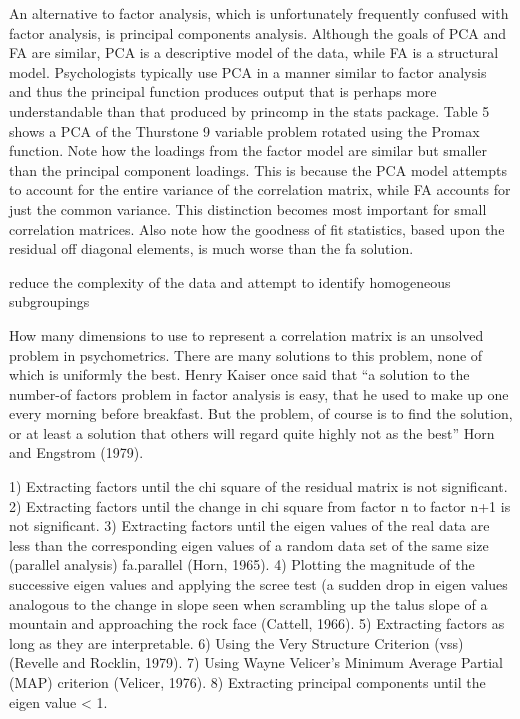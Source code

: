 An alternative to factor analysis, which is unfortunately frequently confused with factor
analysis, is principal components analysis. Although the goals of PCA and FA are similar,
PCA is a descriptive model of the data, while FA is a structural model. Psychologists
typically use PCA in a manner similar to factor analysis and thus the principal function
produces output that is perhaps more understandable than that produced by princomp
in the stats package. Table 5 shows a PCA of the Thurstone 9 variable problem rotated
using the Promax function. Note how the loadings from the factor model are similar but
smaller than the principal component loadings. This is because the PCA model attempts
to account for the entire variance of the correlation matrix, while FA accounts for just the
common variance. This distinction becomes most important for small correlation matrices.
Also note how the goodness of fit statistics, based upon the residual off diagonal elements,
is much worse than the fa solution.


reduce the complexity of the data
and attempt to identify homogeneous subgroupings


How many dimensions to use to represent a correlation matrix is an unsolved problem in
psychometrics. There are many solutions to this problem, none of which is uniformly the
best. Henry Kaiser once said that “a solution to the number-of factors problem in factor
analysis is easy, that he used to make up one every morning before breakfast. But the
problem, of course is to find the solution, or at least a solution that others will regard quite
highly not as the best” Horn and Engstrom (1979).

1) Extracting factors until the chi square of the residual matrix is not significant.
2) Extracting factors until the change in chi square from factor n to factor n+1 is not
significant.
3) Extracting factors until the eigen values of the real data are less than the corresponding
eigen values of a random data set of the same size (parallel analysis) fa.parallel (Horn,
1965).
4) Plotting the magnitude of the successive eigen values and applying the scree test (a
sudden drop in eigen values analogous to the change in slope seen when scrambling up the
talus slope of a mountain and approaching the rock face (Cattell, 1966).
5) Extracting factors as long as they are interpretable.
6) Using the Very Structure Criterion (vss) (Revelle and Rocklin, 1979).
7) Using Wayne Velicer’s Minimum Average Partial (MAP) criterion (Velicer, 1976).
8) Extracting principal components until the eigen value < 1.



